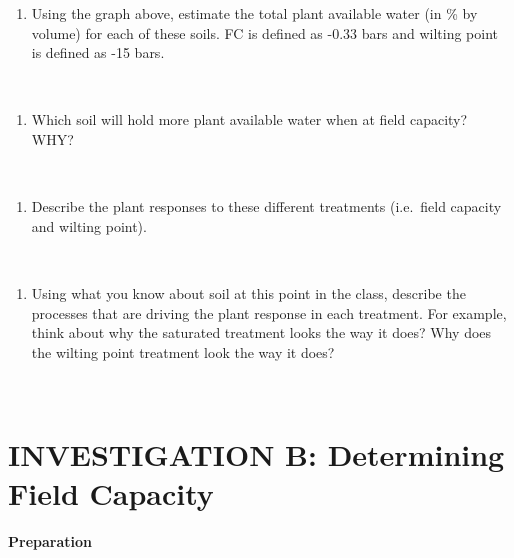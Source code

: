 \documentclass[
  letterpaper,
  twocolumn,
  portrait]{scrbook}
\providecommand{\tightlist}{%
  \setlength{\itemsep}{0pt}\setlength{\parskip}{0pt}}\usepackage{longtable,booktabs,array}
\begin{document}
\begin{enumerate}
\def\labelenumi{\arabic{enumi}.}
\tightlist
\item
  Using the graph above, estimate the total plant available water (in \%
  by volume) for each of these soils. FC is defined as -0.33 bars and
  wilting point is defined as -15 bars.
\end{enumerate}

~ ~ ~ ~

\begin{enumerate}
\def\labelenumi{\arabic{enumi}.}
\setcounter{enumi}{1}
\tightlist
\item
  Which soil will hold more plant available water when at field
  capacity? WHY?
\end{enumerate}

~ ~ ~ ~

\begin{enumerate}
\def\labelenumi{\arabic{enumi}.}
\setcounter{enumi}{2}
\tightlist
\item
  Describe the plant responses to these different treatments (i.e.~field
  capacity and wilting point).
\end{enumerate}

~ ~ ~ ~

\begin{enumerate}
\def\labelenumi{\arabic{enumi}.}
\setcounter{enumi}{3}
\tightlist
\item
  Using what you know about soil at this point in the class, describe
  the processes that are driving the plant response in each treatment.
  For example, think about why the saturated treatment looks the way it
  does? Why does the wilting point treatment look the way it does?
\end{enumerate}

~ ~ ~ ~

\hypertarget{investigation-b-determining-field-capacity}{%
\section{INVESTIGATION B: Determining Field
Capacity}\label{investigation-b-determining-field-capacity}}

\textbf{Preparation}
\end{document}
